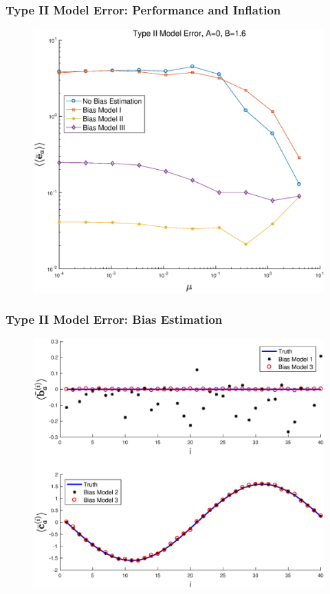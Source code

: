 \documentclass{beamer}
\begin{document}
\begin{frame}
\frametitle{Type II Model Error: Performance and Inflation}
\begin{figure} 
\centering
\includegraphics[scale=0.4]{Figures/AErrVsMuM2_1}
\end{figure}
\end{frame}

\begin{frame}
\frametitle{Type II Model Error: Bias Estimation}
\begin{figure} 
\centering
\includegraphics[scale=0.4]{Figures/BiasEstM2}
\end{figure}
\end{frame}
\end{document}
